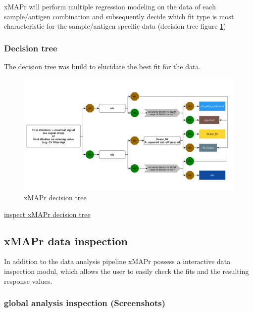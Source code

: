 \documentclass[
]{book}
\begin{document}
xMAPr will perform multiple regression modeling on the data of each sample/antigen combination and subsequently decide which fit type is most characteristic for the sample/antigen specific data (decision tree figure \ref{fig:xMAPrDecTree})

\hypertarget{decision-tree}{%
\subsubsection{Decision tree}\label{decision-tree}}

The decision tree was build to elucidate the best fit for the data.

\begin{figure}
\includegraphics[width=33.58in]{figures/fit_decision_tree_small} \caption{xMAPr decision tree}\label{fig:xMAPrDecTree}
\end{figure}

\href{figures/fit_decision_tree_small.png}{inspect xMAPr decision tree}

\hypertarget{xmapr-data-inspection}{%
\subsection{xMAPr data inspection}\label{xmapr-data-inspection}}

In addition to the data analysis pipeline xMAPr possess a interactive data inspection modul, which allows the user to easily check the fits and the resulting response values.

\hypertarget{global-analysis-inspection-screenshots}{%
\subsubsection{global analysis inspection (Screenshots)}\label{global-analysis-inspection-screenshots}}
\end{document}
